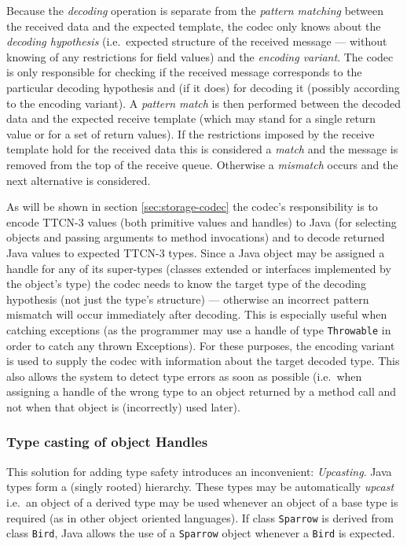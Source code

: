 Because the \emph{decoding} operation is separate from the
\emph{pattern matching} between the received data and the expected template,
the codec only knows about the \emph{decoding hypothesis}
(i.e.\ expected structure of the received message ---
without knowing of any restrictions for field values)
and the \emph{encoding variant}.
The codec is only responsible for checking if the received message
corresponds to the particular decoding hypothesis
and (if it does) for decoding it (possibly according to the encoding variant).
A \emph{pattern match} is then performed between the decoded data
and the expected receive template
(which may stand for a single return value or for a set of return values).
If the restrictions imposed by the receive template hold for the received data
this is considered a \emph{match}
and the message is removed from the top of the receive queue.
Otherwise a \emph{mismatch} occurs and the next alternative is considered.

As will be shown in section \ref{sec:storage-codec}
the codec's responsibility is to
encode \ac{TTCN-3} values (both primitive values and handles)
to Java (for selecting objects and passing arguments to method invocations)
and to decode returned Java values to expected \ac{TTCN-3} types.
Since a Java object may be assigned a handle for any of its super-types
(classes extended or interfaces implemented by the object's type)
the codec needs to know the target type of the decoding hypothesis
(not just the type's structure) ---
otherwise an incorrect pattern mismatch will occur immediately after decoding.
This is especially useful when catching exceptions
(as the programmer may use a handle of type \verb=Throwable=
in order to catch any thrown Exceptions).
For these purposes, the encoding variant is used
to supply the codec with information about the target decoded type.
This also allows the system to detect type errors as soon as possible
(i.e.\ when assigning a handle of the wrong type
to an object returned by a method call
and not when that object is (incorrectly) used later).


\subsubsection{Type casting of object Handles}
\label{sec:type-casting}

This solution for adding type safety introduces an inconvenient:
\emph{Upcasting}.
Java types form a (singly rooted) hierarchy.
These types may be automatically \emph{upcast}
i.e.\ an object of a derived type may be used
whenever an object of a base type is required
(as in other object oriented languages).
If class \verb=Sparrow= is derived from class \verb=Bird=,
Java allows the use of a \verb=Sparrow= object
whenever a \verb=Bird= is expected.

